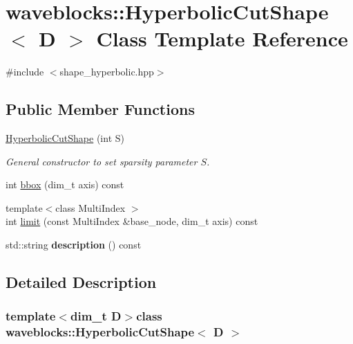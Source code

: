 \hypertarget{classwaveblocks_1_1_hyperbolic_cut_shape}{}\section{waveblocks\+:\+:Hyperbolic\+Cut\+Shape$<$ D $>$ Class Template Reference}
\label{classwaveblocks_1_1_hyperbolic_cut_shape}


{\ttfamily \#include $<$shape\+\_\+hyperbolic.\+hpp$>$}

\subsection*{Public Member Functions}
\begin{DoxyCompactItemize}
\item 
\hyperlink{classwaveblocks_1_1_hyperbolic_cut_shape_a1fb07940123e66e7476af9dccf0f19ff}{Hyperbolic\+Cut\+Shape} (int S)
\begin{DoxyCompactList}\small\item\em General constructor to set sparsity parameter $ S $. \end{DoxyCompactList}\item 
int \hyperlink{classwaveblocks_1_1_hyperbolic_cut_shape_a587ac7f5ebbf2099f798cc8b86013e90}{bbox} (dim\+\_\+t axis) const 
\item 
{\footnotesize template$<$class Multi\+Index $>$ }\\int \hyperlink{classwaveblocks_1_1_hyperbolic_cut_shape_ab70461ae7d0d60da0035076e3719d18d}{limit} (const Multi\+Index \&base\+\_\+node, dim\+\_\+t axis) const 
\item 
\hypertarget{classwaveblocks_1_1_hyperbolic_cut_shape_a376f0f7455b1b1511c9812f329e5fa4c}{}std\+::string {\bfseries description} () const \label{classwaveblocks_1_1_hyperbolic_cut_shape_a376f0f7455b1b1511c9812f329e5fa4c}

\end{DoxyCompactItemize}


\subsection{Detailed Description}
\subsubsection*{template$<$dim\+\_\+t D$>$class waveblocks\+::\+Hyperbolic\+Cut\+Shape$<$ D $>$}

